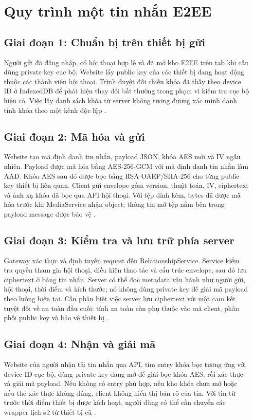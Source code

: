 \section{Quy trình một tin nhắn E2EE}
\subsection{Giai đoạn 1: Chuẩn bị trên thiết bị gửi}
Người gửi đã đăng nhập, có hội thoại hợp lệ và đã mở kho E2EE trên tab khi cần dùng private key cục bộ. Website lấy public key của các thiết bị đang hoạt động thuộc các thành viên hội thoại. Trình duyệt đối chiếu khóa đã thấy theo device ID ở IndexedDB để phát hiện thay đổi bất thường trong phạm vi kiểm tra cục bộ hiện có. Việc lấy danh sách khóa từ server không tương đương xác minh danh tính khóa theo một kênh độc lập \cite{e2ee,relationship}.

\subsection{Giai đoạn 2: Mã hóa và gửi}
Website tạo mã định danh tin nhắn, payload JSON, khóa AES mới và IV ngẫu nhiên. Payload được mã hóa bằng AES-256-GCM với mã định danh tin nhắn làm AAD. Khóa AES sau đó được bọc bằng RSA-OAEP/SHA-256 cho từng public key thiết bị liên quan. Client gửi envelope gồm version, thuật toán, IV, ciphertext và ánh xạ khóa đã bọc qua API hội thoại. Với tệp đính kèm, bytes đã được mã hóa trước khi MediaService nhận object; thông tin mở tệp nằm bên trong payload message được bảo vệ \cite{e2ee}.

\subsection{Giai đoạn 3: Kiểm tra và lưu trữ phía server}
Gateway xác thực và định tuyến request đến RelationshipService. Service kiểm tra quyền tham gia hội thoại, điều kiện thao tác và cấu trúc envelope, sau đó lưu ciphertext ở bảng tin nhắn. Server có thể đọc metadata vận hành như người gửi, hội thoại, thời điểm và kích thước; nó không dùng private key để giải mã payload theo luồng hiện tại. Cần phân biệt việc server lưu ciphertext với một cam kết tuyệt đối về an toàn đầu cuối: tính an toàn còn phụ thuộc vào mã client, phân phối public key và bảo vệ thiết bị \cite{e2ee,relationship}.

\subsection{Giai đoạn 4: Nhận và giải mã}
Website của người nhận tải tin nhắn qua API, tìm entry khóa bọc tương ứng với device ID cục bộ, dùng private key đang mở để giải bọc khóa AES, rồi xác thực và giải mã payload. Nếu không có entry phù hợp, nếu kho khóa chưa mở hoặc nếu thẻ xác thực không đúng, client không hiển thị bản rõ của tin. Với tin từ trước thời điểm thiết bị được kích hoạt, người dùng có thể cần chuyển các wrapper lịch sử từ thiết bị cũ \cite{e2ee}.

